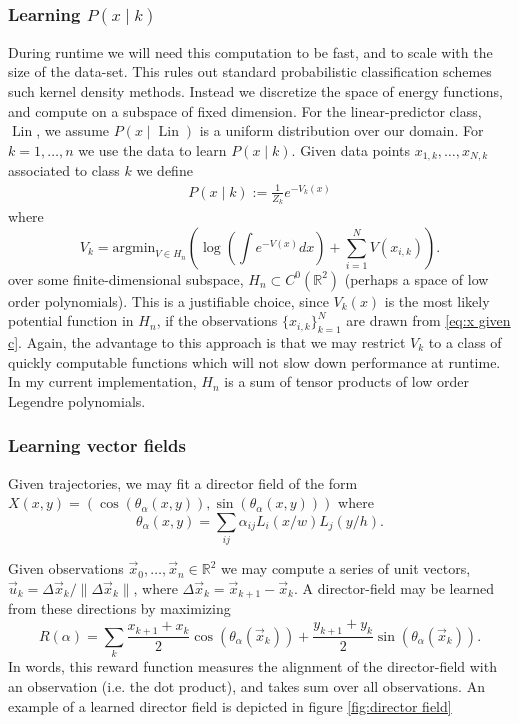 \documentclass[12pt]{amsart}
\DeclareMathOperator{\Lin}{Lin}
\begin{document}
\subsubsection{Learning $P(x \mid k)$ }
During runtime we will need this computation to be fast, and to scale with the size of the data-set.
This rules out standard probabilistic classification schemes such kernel density methods.
Instead we discretize the space of energy functions, and compute on a subspace of fixed dimension.
For the linear-predictor class, $\Lin$, we assume $P(x \mid \Lin )$ is a uniform distribution over our domain.
For $k = 1, \dots, n$ we use the data to learn $P(x \mid k)$.
Given data points $x_{1,k},\dots,x_{N,k}$ associated to class $k$ we define
\begin{align}
	P(x \mid k) := \frac{1}{Z_k } e^{-V_k(x) } \label{eq:x given c}
\end{align}
where
$$
	V_k =  \text{argmin}_{V \in H_n}  \left( \log \left( \int e^{ - V(x) } dx \right) + \sum_{i=1}^N V(x_{i,k} ) \right).
$$
over some finite-dimensional subspace, $H_n \subset C^0( \mathbb{R}^2)$ (perhaps a space of low order polynomials).
This is a justifiable choice, since $V_k(x)$ is the most likely potential function in $H_n$, if the observations $\{ x_{i,k}\}_{k=1}^N$ are drawn from \eqref{eq:x given c}.
Again, the advantage to this approach is that we may restrict $V_k$ to a class of quickly computable functions which will not slow down performance at runtime.
In my current implementation, $H_n$ is a sum of tensor products of low order Legendre polynomials.

\subsubsection{Learning vector fields}
Given trajectories, we may fit a director field of the form $X(x,y) = ( \cos( \theta_\alpha(x,y) ) , \sin( \theta_\alpha(x,y) ) )$
where 
$$
	\theta_\alpha(x,y) = \sum_{ij} \alpha_{ij} L_i(x / w) L_j(y / h).
$$


Given observations $\vec{x}_0,  \dots, \vec{x}_n \in \mathbb{R}^2$ we may compute a series of unit vectors, $\vec{u}_k = \Delta \vec{x}_k / \| \Delta \vec{x}_k  \|$,
where $\Delta \vec{x}_k = \vec{x}_{k+1} - \vec{x}_k$.
A director-field may be learned from these directions by maximizing
$$
	R(\alpha ) = \sum_{k} \frac{x_{k+1} + x_k}{2} \cos( \theta_\alpha(\vec{x}_k) ) + \frac{y_{k+1} + y_k}{2}  \sin( \theta_\alpha( \vec{x}_k ) ).
$$
In words, this reward function measures the alignment of the director-field with an observation (i.e. the dot product), and takes sum over all observations.
An example of a learned director field is depicted in figure \ref{fig:director field}





\end{document}
